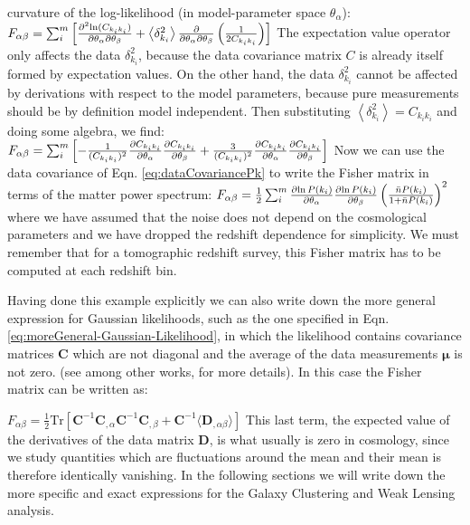 curvature of the log-likelihood (in model-parameter space $\theta_{\alpha}$):
\beeq$\label{eq:Fisher-fromloglik}
F_{\alpha \beta} = \sum_{i}^{m} \left[ \frac{\partial^2{\ln(C_{k_{i} k_{i}})}}{\partial{\theta_{\alpha}}\partial{\theta_{\beta}}} + 
\left\langle \delta^2_{k_i} \right\rangle \frac{\partial}{\partial{\theta_{\alpha}}\partial{\theta_{\beta}}}\left(\frac{1}{2  C_{k_{i} k_{i}}} \right) \right] 
$
The expectation value operator only affects the data $\delta^2_{k_i}$, because the data covariance matrix $C$ is 
already itself formed by expectation values. On the other hand, the data $\delta^2_{k_i}$ cannot be affected by
derivations with respect to the model parameters, because pure measurements should be by definition model independent.
Then substituting $\left\langle \delta^2_{k_i} \right\rangle = C_{k_{i} k_{i}}$
and doing some algebra, we find:
\beeqp$ \label{eq:Fisher-fromloglik-second}
F_{\alpha \beta} = \sum_{i}^{m} \left[-
 \frac{1}{(C_{k_{i} k_{i}})^2}\frac{\partial{C_{k_{i} k_{i}}}}{\partial{\theta_{\alpha}}}\frac{\partial{C_{k_{i} k_{i}}}}{\partial{\theta_{\beta}}}
+ \frac{3}{(C_{k_{i} k_{i}})^2}\frac{\partial{C_{k_{i} k_{i}}}}{\partial{\theta_{\alpha}}}\frac{\partial{C_{k_{i} k_{i}}}}{\partial{\theta_{\beta}}} \right] 
$
Now we can use the data covariance of Eqn. \ref{eq:dataCovariancePk} to write the Fisher matrix in terms of the matter power
spectrum:
\beeqc$ \label{eq:Fisher-fromloglik-inPk}
F_{\alpha \beta} = \frac{1}{2}\sum_{i}^{m} 
 \frac{\partial{\ln P(k_i)}}{\partial{\theta_{\alpha}}}\frac{\partial{\ln P(k_i)}}{\partial{\theta_{\beta}}}
\left(  \frac{\bar{n} P(k_i)}{1+\bar{n} P(k_i)}  \right)^2
$
where we have assumed that the noise does not depend on the cosmological parameters and we have dropped
the redshift dependence for simplicity. We must remember that for a tomographic redshift survey,
this Fisher matrix has to be computed at each redshift bin.

Having done this example explicitly we can also write down the more general expression for Gaussian likelihoods, such as the one
specified in Eqn.\ref{eq:moreGeneral-Gaussian-Likelihood}, in which
the likelihood contains covariance matrices $\bm C$ which are not diagonal and the average
of the data measurements $\bm \mu$ is not zero. (see \cite{cite Luca, Dodelson}
among other works, for more details). In this case the Fisher matrix can be written as:

\beeq$ \label{eq:Fisher-MatrixForm-GaussianGeneral}
F_{\alpha \beta} = \frac{1}{2}\mathrm{Tr}\left[\bm{C}^{-1}\bm{C}_{,\alpha}\bm{C}^{-1}\bm{C}_{,\beta}
+ \bm{C}^{-1}\langle \bm{D}_{,\alpha \beta} \rangle  
\right]
$
This last term, the expected value of the derivatives of the data matrix $\bm D$, is what usually is zero
in cosmology, since we study quantities which are fluctuations around the mean and their mean is therefore identically
vanishing.
In the following sections we will write down the more specific and exact expressions for 
the Galaxy Clustering and Weak Lensing analysis.

